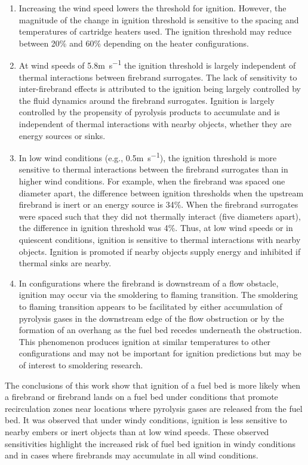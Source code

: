         \begin{enumerate}
            \item Increasing the wind speed lowers the threshold for ignition. However, the magnitude of the change in ignition threshold is sensitive to the spacing and temperatures of cartridge heaters used. The ignition threshold may reduce between 20\% and 60\% depending on the heater configurations.
            
            \item At wind speeds of 5.8\si{\meter\per\second} the ignition threshold is largely independent of thermal interactions between firebrand surrogates. The lack of sensitivity to inter-firebrand effects is attributed to the ignition being largely controlled by the fluid dynamics around the firebrand surrogates. Ignition is largely controlled by the propensity of pyrolysis products to accumulate and is independent of thermal interactions with nearby objects, whether they are energy sources or sinks. 
            
            \item In low wind conditions (e.g., 0.5\si{\meter\per\second}), the ignition threshold is more sensitive to thermal interactions between the firebrand surrogates than in higher wind conditions. For example, when the firebrand was spaced one diameter apart, the difference between ignition thresholds when the upstream firebrand is inert or an energy source is 34\%. When the firebrand surrogates were spaced such that they did not thermally interact (five diameters apart), the difference in ignition threshold was 4\%. Thus, at low wind speeds or in quiescent conditions, ignition is sensitive to thermal interactions with nearby objects. Ignition is promoted if nearby objects supply energy and inhibited if thermal sinks are nearby. 
            
            \item In configurations where the firebrand is downstream of a flow obstacle, ignition may occur via the smoldering to flaming transition. The smoldering to flaming transition appears to be facilitated by either accumulation of pyrolysis gases in the downstream edge of the flow obstruction or by the formation of an overhang as the fuel bed recedes underneath the obstruction. This phenomenon produces ignition at similar temperatures to other configurations and may not be important for ignition predictions but may be of interest to smoldering research. 
        \end{enumerate}
    The conclusions of this work show that ignition of a fuel bed is more likely when a firebrand or firebrand lands on a fuel bed under conditions that promote recirculation zones near locations where pyrolysis gases are released from the fuel bed. It was observed that under windy conditions, ignition is less sensitive to nearby embers or inert objects than at low wind speeds. These observed sensitivities highlight the increased risk of fuel bed ignition in windy conditions and in cases where firebrands may accumulate in all wind conditions. 